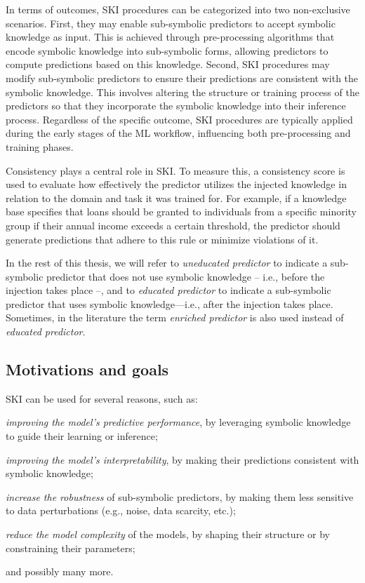In terms of outcomes, \gls{SKI} procedures can be categorized into two non-exclusive scenarios.
%
First, they may enable sub-symbolic predictors to accept symbolic knowledge as input.
%
This is achieved through pre-processing algorithms that encode symbolic knowledge into sub-symbolic forms, allowing predictors to compute predictions based on this knowledge.
%
Second, \gls{SKI} procedures may modify sub-symbolic predictors to ensure their predictions are consistent with the symbolic knowledge.
%
This involves altering the structure or training process of the predictors so that they incorporate the symbolic knowledge into their inference process.
%
Regardless of the specific outcome, \gls{SKI} procedures are typically applied during the early stages of the \gls{ML} workflow, influencing both pre-processing and training phases.

Consistency plays a central role in \gls{SKI}.
%
To measure this, a consistency score is used to evaluate how effectively the predictor utilizes the injected knowledge in relation to the domain and task it was trained for.
%
For example, if a knowledge base specifies that loans should be granted to individuals from a specific minority group if their annual income exceeds a certain threshold, the predictor should generate predictions that adhere to this rule or minimize violations of it.

In the rest of this thesis, we will refer to \emph{uneducated predictor} to indicate a sub-symbolic predictor that does not use symbolic knowledge -- i.e., before the injection takes place --, and to \emph{educated predictor} to indicate a sub-symbolic predictor that uses symbolic knowledge---i.e., after the injection takes place.
%
Sometimes, in the literature the term \emph{enriched predictor} is also used instead of \emph{educated predictor}.


\subsection{Motivations and goals}\label{subsec:ski-motivations-and-goals}
%
\Gls{SKI} can be used for several reasons, such as:
%
\begin{inlinelist}
    \item \label{itm:prediction}\emph{improving the model's predictive performance}, by leveraging symbolic knowledge to guide their learning or inference;
    \item \label{itm:interpretability}\emph{improving the model's interpretability}, by making their predictions consistent with symbolic knowledge;
    \item \label{itm:robustness}\emph{increase the robustness} of sub-symbolic predictors, by making them less sensitive to data perturbations (e.g., noise, data scarcity, etc.);
    \item \label{itm:complexity}\emph{reduce the model complexity} of the models, by shaping their structure or by constraining their parameters;
    \item and possibly many more.
\end{inlinelist}


